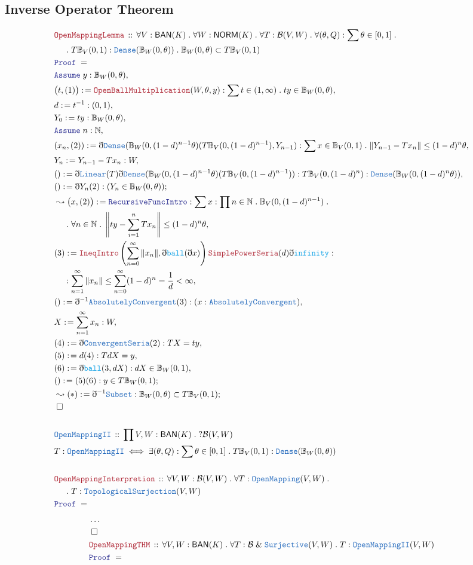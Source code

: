\documentclass[12pt]{scrartcl}
\newcommand{\TYPE}[1]{\textcolor{NavyBlue}{\mathtt{#1}}}
\newcommand{\FUNC}[1]{\textcolor{Cerulean}{\mathtt{#1}}}
\newcommand{\LOGIC}[1]{\textcolor{Blue}{\mathtt{#1}}}
\newcommand{\THM}[1]{\textcolor{Maroon}{\mathtt{#1}}}
\renewcommand{\.}{\; . \;}
\newcommand{\de}{: \kern 0.1pc =}
\newcommand{\Theorem}[2]{& \THM{#1} \, :: \, #2 \\ & \Proof = \\ }
\newcommand{\DeclareType}[2]{& \TYPE{#1} \, :: \, #2 \\}
\newcommand{\DefineType}[3]{& #1 : \TYPE{#2} \iff #3 \\}
\newcommand{\NewLine}{\\ & \kern 1pc}
\newcommand{\Page}[1]{\begin{align*} #1 \end{align*} \newpage   }
\newcommand{ \bd }{ \ByDef }
\newcommand{\NoProof}{ & \ldots \\ \EndProof}
\renewcommand{\And}{\; \& \;}
\newcommand{\Nat}{\mathbb{N} }
\newcommand{\Say}[3]{& #1 \de #2 : #3, \\}
\newcommand{\Conclude}[3]{& #1 \de #2 : #3; \\}
\newcommand{\Derive}[3]{& \leadsto #1 \de #2 : #3, \\}
\newcommand{\DeriveConclude}[3]{& \leadsto #1 \de #2 : #3 ; \\}
\newcommand{\A}{\LOGIC{Assume} \;}
\newcommand{\Assume}[2]{& \A #1 : #2, \\}
\newcommand{\QED}{\; \square}
\newcommand{\EndProof}{& \QED \\}
\newcommand{\ByDef}{\eth}
\newcommand{\Proof}{\LOGIC{Proof} \; }
\newcommand{\NORM}{\textsf{NORM}}
\newcommand{\BAN}{\textsf{BAN}}
\newcommand{\B}{\mathcal{B}}
\begin{document}
\subsection{Inverse Operator Theorem}
\Page{
 \Theorem{OpenMappingLemma}{\forall V : \BAN(K) \.  \forall W : \NORM(K) \. \forall T : \B(V,W) \. \forall  (\theta, Q) : \sum \theta \in [0,1] \. \NewLine \.  
 T \mathbb{B}_V(0,1) : \TYPE{Dense}(\mathbb{B}_W(0,\theta))
 \.  \mathbb{B}_W(0,\theta) \subset   T \mathbb{B}_V(0,1)
 }
 \Assume{y}{\mathbb{B}_W(0,\theta)}
 \Say{\big(t,(1) \big)}{\THM{OpenBallMultiplication}(W,\theta,y)}{ \sum t \in (1, \infty) \. ty \in \mathbb{B}_W(0,\theta)}
 \Say{d}{t^{-1}}{(0,1)} 
 \Say{Y_0}{ty}{\mathbb{B}_W(0,\theta)}
 \Assume{n}{\Nat}
 \Say{(x_n,(2))}{\bd \TYPE{Dense}(\mathbb{B}_W(0, (1 - d)^{n - 1}\theta)(T\mathbb{B}_V(0,(1 -d)^{n - 1}),Y_{n - 1})}{
 \sum x \in \mathbb{B}_V(0,1) \. \| Y_{n - 1} - Tx_n \| \le (1 -d)^n \theta }
 \Say{Y_n}{Y_{n - 1} - Tx_n}{W}
 \Say{()}{\bd \TYPE{Linear}(T)\bd\TYPE{Dense}(\mathbb{B}_W(0,(1 - d)^{n-1}\theta)(T\mathbb{B}_V(0,(1 - d)^{n - 1}))}
 { T\mathbb{B}_V(0,(1 - d)^{n}) : \TYPE{Dense}(\mathbb{B}_W(0,(1 -d)^{n}\theta)) }
 \Conclude{()}{\bd Y_n(2)}{(Y_n \in \mathbb{B}_W(0,\theta))}
 \Derive{\big(x,(2) \big)}{\LOGIC{RecursiveFuncIntro}}{  \sum x : \prod n \in \Nat \.  \mathbb{B}_V(0, (1 - d)^{n - 1})
 \.  \NewLine
 \. \forall n \in  \Nat \.  
  \left\| ty - \sum^n_{i = 1} Tx_n \right\| \le (1 - d)^n \theta
 }
 \Say{(3)}{\THM{IneqIntro}\left( \sum^{\infty}_{n = 0} \| x_n \|, \bd \FUNC{ball}(\bd x)
  \right)
 \THM{SimplePowerSeria}(d)\bd \FUNC{infinity} 
 }{ 
 \NewLine : 
 \sum^{\infty}_{n = 1} \| x_n \| \le  \sum^{\infty}_{n = 0} (1 - d)^n = \frac{1}{d} < \infty}
\Say{()}{\bd^{-1}\TYPE{AbsolutelyConvergent}(3)}{(x : \TYPE{AbsolutelyConvergent})}
\Say{X}{ \sum^{\infty}_{n = 1} x_n}{W}
\Say{(4)}{\bd\TYPE{ConvergentSeria}(2)}{TX = ty}
\Say{(5)}{d(4)}{TdX = y}  
\Say{(6)}{\bd \FUNC{ball}(3,dX)}{dX \in \mathbb{B}_W(0,1)}
\Conclude{()}{(5)(6)}{y \in T\mathbb{B}_W(0,1)}
\DeriveConclude{(*)}{\bd^{-1} \TYPE{Subset}}{\mathbb{B}_W(0,\theta) \subset   T \mathbb{B}_V(0,1)} 
\EndProof
\\
\DeclareType{OpenMappingII}{\prod V,W : \BAN(K) \. ?\B(V,W)}
\DefineType{T}{OpenMappingII}{\exists  (\theta, Q) : \sum \theta \in [0,1] \.  
 T \mathbb{B}_V(0,1) : \TYPE{Dense}(\mathbb{B}_W(0,\theta))}
 \\
 \Theorem{OpenMappingInterpretion}{\forall V,W : \B(V,W) \.  \forall T : \TYPE{OpenMapping}(V,W) \.
 \NewLine \.
  T : \TYPE{TopologicalSurjection}(V,W)}
 }  \Page{
 \NoProof
\Theorem{OpenMappingTHM}{\forall V,W : \BAN(K) \. \forall T : \mathcal{B} \And \TYPE{Surjective}(V,W) \. T : \TYPE{OpenMappingII}(V,W)}
}
\end{document}
